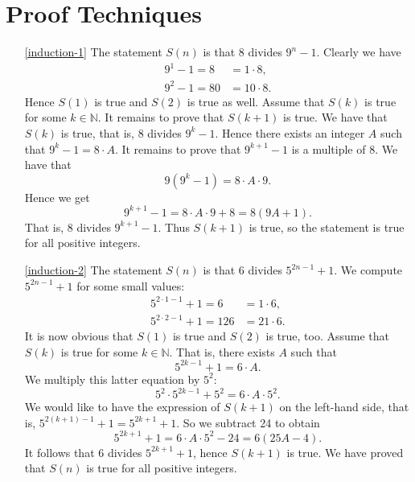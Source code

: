 \section{Proof Techniques}
\begin{enumerate}
\item[\ref{induction-1}] The statement $S(n)$ is that 8 divides $9^n-1$. Clearly we have
\begin{align*}
9^1-1=8&=1\cdot 8,\\
9^2-1=80&=10\cdot 8.
\end{align*}
Hence $S(1)$ is true and $S(2)$ is true as well. Assume that $S(k)$ is true for some
$k\in\mathbb{N}$. It remains to prove that $S(k+1)$ is true. We have that $S(k)$ is true, that is, 8 divides $9^k-1$. Hence there exists
an integer $A$ such that $9^k-1=8\cdot A$. It remains to prove that $9^{k+1}-1$ is a multiple of 8. We have that
$$
9(9^k-1)=8\cdot A\cdot 9.
$$
Hence we get
$$
9^{k+1}-1=8\cdot A\cdot 9+8=8(9A+1).
$$
That is, 8 divides $9^{k+1}-1$. Thus $S(k+1)$ is true, so the statement is true for all positive integers.

\item[\ref{induction-2}] The statement $S(n)$ is that 6 divides $5^{2n-1}+1$. We compute $5^{2n-1}+1$ for some
small values:
\begin{align*}
5^{2\cdot 1-1}+1=6&=1\cdot 6,\\
5^{2\cdot 2-1}+1=126&=21\cdot 6.
\end{align*}
It is now obvious that $S(1)$ is true and $S(2)$ is true, too. Assume that $S(k)$ is true for some
$k\in\mathbb{N}$. That is, there exists $A$ such that 
$$5^{2k-1}+1=6\cdot A.$$ 
We multiply this latter 
equation by $5^2:$
$$
5^2\cdot 5^{2k-1}+5^2=6\cdot A \cdot 5^2.
$$
We would like to have the expression of $S(k+1)$ on the left-hand side, that is, $5^{2(k+1)-1}+1=5^{2k+1}+1$.
So we subtract 24 to obtain
$$
5^{2k+1}+1=6\cdot A \cdot 5^2-24=6(25A-4).
$$
It follows that 6 divides $5^{2k+1}+1$, hence $S(k+1)$ is true. We have proved that $S(n)$ is true for
all positive integers.


\end{enumerate}
